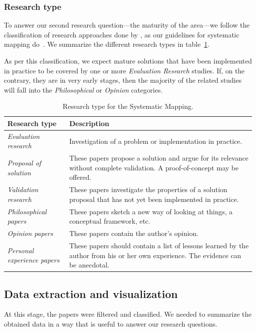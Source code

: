 \subsubsection{Research type}
To answer our second research question---the maturity of the area---we follow
the classification of research approaches done by \cite{Wieringa2006},
as our guidelines for systematic mapping do~\cite{Petersen2007}.
We summarize the different research types in table~\ref{tab:mapping/research_type}.

As per this classification, we expect mature solutions that have been
implemented in practice to be covered by one or more \emph{Evaluation Research}
studies. If, on the contrary, they are in very early stages, then the majority
of the related studies will fall into the \emph{Philosophical} or
\emph{Opinion} categories.

\begin{table}[hptb]
  \small
  \begin{tabularx}{\textwidth}{l >{\raggedright\arraybackslash}X}
    \hline
    \textbf{Research type} & \textbf{Description} \\
    \hline
    \textit{Evaluation research} & Investigation of a problem or implementation in practice. \\
    \textit{Proposal of solution} & These papers propose a solution and argue for its relevance without
      complete validation. A proof-of-concept may be offered. \\
    \textit{Validation research} & These papers investigate the properties of a solution proposal that
      has not yet been implemented in practice. \\
    \textit{Philosophical papers} & These papers sketch a new way of looking at things, a conceptual
      framework, etc. \\
    \textit{Opinion papers} & These papers contain the author's opinion. \\
    \textit{Personal experience papers} & These papers should contain a list of lessons learned by the
      author from his or her own experience. The evidence can be anecdotal. \\
  \end{tabularx}
  \caption{Research type for the Systematic Mapping.}\label{tab:mapping/research_type}
\end{table}

\subsection{Data extraction and visualization}
At this stage, the papers were filtered and classified. We needed to summarize
the obtained data in a way that is useful to answer our research questions.

